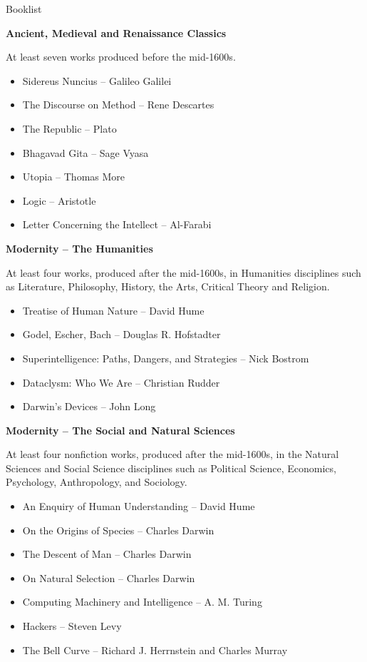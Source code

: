 \documentclass[11pt]{article}
\begin{document}
\newpage

{\Large Booklist\\\par}

\par \textbf{Ancient, Medieval and Renaissance Classics}
\par At least seven works produced before the mid-1600s.
\begin{itemize}
	\item Sidereus Nuncius ­-- Galileo Galilei
	\item The Discourse on Method -- Rene Descartes
	\item The Republic -- Plato
	\item Bhagavad Gita -- Sage Vyasa
	\item Utopia -- Thomas More
	\item Logic -- Aristotle
	\item Letter Concerning the Intellect -- Al-Farabi
\end{itemize}

\par \textbf{Modernity -- The Humanities}
\par At least four works, produced after the mid-1600s, in Humanities disciplines such as Literature, Philosophy, History, the Arts, Critical Theory and Religion.
\begin{itemize}
	\item Treatise of Human Nature -- David Hume
	\item Godel, Escher, Bach -- Douglas R. Hofstadter
	\item Superintelligence: Paths, Dangers, and Strategies -- Nick Bostrom
	\item Dataclysm: Who We Are -- Christian Rudder
	\item Darwin's Devices -- John Long
\end{itemize}

\par \textbf{Modernity -- The Social and Natural Sciences}
\par At least four nonfiction works, produced after the mid-1600s, in the Natural Sciences and Social Science disciplines such as Political Science, Economics, Psychology, Anthropology, and Sociology.
\begin{itemize}
	\item An Enquiry of Human Understanding -- David Hume
	\item On the Origins of Species -- Charles Darwin
	\item The Descent of Man -- Charles Darwin
	\item On Natural Selection -- Charles Darwin
	\item Computing Machinery and Intelligence -- A. M. Turing
	\item Hackers -- Steven Levy
	\item The Bell Curve -- Richard J. Herrnstein and Charles Murray
\end{itemize}
\end{document}

